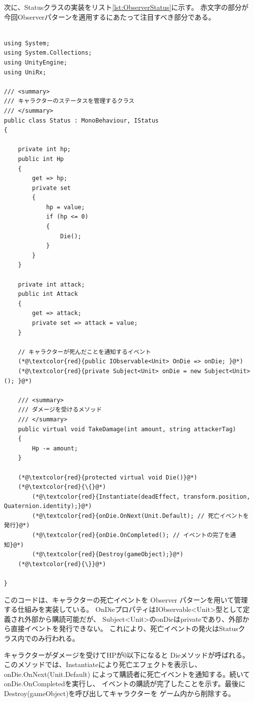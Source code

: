 \documentclass[dvipdfmx,fleqn,article]{jlreq}
\begin{document}
次に、Statusクラスの実装をリスト\ref{lst:ObserverStatus}に示す。
赤文字の部分が今回Observerパターンを適用するにあたって注目すべき部分である。
\begin{lstlisting}[language=CSharp, caption=ObserverパターンにおけるStatusクラス, label={lst:ObserverStatus}]

using System;
using System.Collections;
using UnityEngine;
using UniRx;

/// <summary>
/// キャラクターのステータスを管理するクラス
/// </summary>
public class Status : MonoBehaviour, IStatus
{

    private int hp;
    public int Hp
    {
        get => hp;
        private set
        {
            hp = value;
            if (hp <= 0)
            {
                Die();
            }
        }
    }

    private int attack;
    public int Attack
    {
        get => attack;
        private set => attack = value;
    }

    // キャラクターが死んだことを通知するイベント
    (*@\textcolor{red}{public IObservable<Unit> OnDie => onDie; }@*)
    (*@\textcolor{red}{private Subject<Unit> onDie = new Subject<Unit>(); }@*)

    /// <summary>
    /// ダメージを受けるメソッド
    /// </summary>
    public virtual void TakeDamage(int amount, string attackerTag)
    {
        Hp -= amount;
    }

    (*@\textcolor{red}{protected virtual void Die()}@*)
    (*@\textcolor{red}{\{}@*)
        (*@\textcolor{red}{Instantiate(deadEffect, transform.position, Quaternion.identity);}@*)
        (*@\textcolor{red}{onDie.OnNext(Unit.Default); // 死亡イベントを発行}@*)
        (*@\textcolor{red}{onDie.OnCompleted(); // イベントの完了を通知}@*)
        (*@\textcolor{red}{Destroy(gameObject);}@*)
    (*@\textcolor{red}{\}}@*)

}
\end{lstlisting}
このコードは、キャラクターの死亡イベントを Observer パターンを用いて管理する仕組みを実装している。
OnDieプロパティはIObservable<Unit>型として定義され外部から購読可能だが、
Subject<Unit>のonDieはprivateであり、外部から直接イベントを発行できない。
これにより、死亡イベントの発火はStatusクラス内でのみ行われる。

キャラクターがダメージを受けてHPが0以下になると Dieメソッドが呼ばれる。
このメソッドでは、Instantiateにより死亡エフェクトを表示し、onDie.OnNext(Unit.Default)
によって購読者に死亡イベントを通知する。続いて onDie.OnCompletedを実行し、
イベントの購読が完了したことを示す。最後にDestroy(gameObject)を呼び出してキャラクターを
ゲーム内から削除する。
\end{document}
